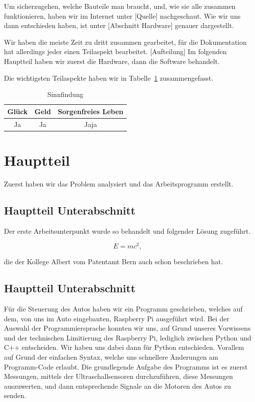 \documentclass[a4paper,12pt]{article}
\begin{document}
Um sicherzugehen, welche Bauteile man braucht, und, wie sie alle zusammen funktionieren, haben wir im Internet unter [Quelle] nachgeschaut.
Wie wir uns dann entschieden haben, ist unter [Abschnitt Hardware] genauer dargestellt.

Wir haben die meiste Zeit zu dritt zusammen gearbeitet, f\"ur die Dokumentation hat allerdings jeder einen Teilaspekt bearbeitet.
[Aufteilung]
Im folgenden Hauptteil haben wir zuerst die Hardware, dann die Software behandelt.

Die wichtigsten Teilaspekte haben wir in Tabelle~\ref{Tab1} zusammengefasst.

\begin{table}[h]
	\centering
	\begin{tabular}{|c|c|c|}
	\hline
		Gl\"uck & Geld  & Sorgenfreies Leben  \\ \hline
		Ja  & Ja & Jaja \\ \hline
	\end{tabular}
	\caption{Sinnfindung}
	\label{Tab1}
\end{table}


\section{Hauptteil}\label{sec2}

Zuerst haben wir das Problem analysiert und das Arbeitsprogramm erstellt.

\subsection{Hauptteil Unterabschnitt}\label{sec2.1}

Der erste Arbeitsunterpunkt wurde so behandelt und folgender L\"osung zugef\"uhrt.

\begin{equation}
	E = mc^2 ,
\end{equation}

die der Kollege Albert vom Patentamt Bern  \cite{Alb05} auch schon beschrieben hat.

\subsection{Hauptteil Unterabschnitt}\label{sec2.2}

F\"ur die Steuerung des Autos haben wir ein Programm geschrieben, welches auf dem, von uns im Auto eingebauten,
Raspberry Pi ausgef\"uhrt wird. Bei der Auswahl der Programmiersprache konnten wir uns, auf Grund unseres Vorwissens und der
technischen Limitierung des Raspberry Pi, lediglich zwischen Python und C++ entscheiden. Wir haben uns dabei dann f\"ur
Python entschieden. Vorallem auf Grund der einfachen Syntax, welche uns schnellere \"Anderungen am Programm-Code erlaubt.
\newline
Die grundlegende Aufgabe des Programms ist es zuerst Messungen, mittels der Ultraschallsensoren durchzuf\"uhren, diese
Messungen auszuwerten, und dann entsprechende Signale an die Motoren des Autos zu senden.
\end{document}
